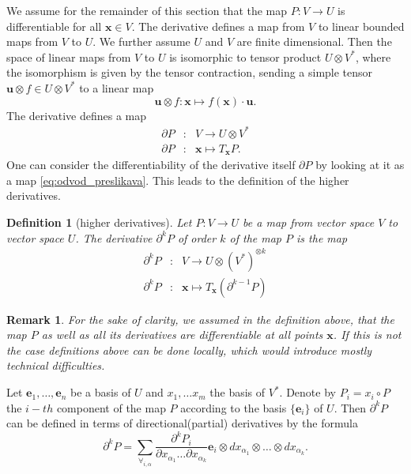 \documentclass[smallcondensed]{svjour3}
\newcommand{\e}{\mathbf{e}}
\newcommand{\x}{\mathbf{x}}
\newcommand{\uu}{\mathbf{u}}
\newcommand{\D}{\partial}
\newtheorem{definicija}{Definition}[section]
\newtheorem{opomba}{Remark}[section]
\begin{document}
We assume for the remainder of this section that the map $P:V\to U$ is
differentiable for all $\x\in V$. The derivative defines a map from $V$ to
linear bounded maps from $V$ to $U$. We further assume $U$ and $V$ are finite
dimensional. Then the space of linear maps from $V$ to $U$ is isomorphic to
tensor product $U\otimes V^*$, where the isomorphism is given by the
tensor contraction, sending a simple tensor $\uu\otimes f\in U\otimes
V^*$ to a linear map
 \begin{equation}
   \label{eq:lin_tenzor}
   \uu\otimes f:\x \mapsto f(\x)\cdot \uu.
 \end{equation}
The derivative defines a map
\begin{eqnarray}
  \label{eq:odvod_preslikava}
  \D P&:& V\to U\otimes V^*\\
  \D P&:& \x \mapsto T_\x P.
\end{eqnarray}
One can consider the differentiability of the derivative itself $\D P$ by
looking at it as a map \eqref{eq:odvod_preslikava}. This leads to the definition
of the higher derivatives.
\begin{definicija}[higher derivatives]
  \label{def:higher_derivatives}
  Let $P:V\to U$ be a map from vector space $V$ to vector space $U$. 
The derivative $\D^k P$ of order $k$ of the map $P$ is the map
\begin{eqnarray}\label{eq:partial}
    \label{eq:visji_odvod}
    \D^kP&:&V\to U\otimes (V^*)^{\otimes k}\\
    \D^kP&:&\x\mapsto T_\x\left( \D^{k-1}P \right)
  \end{eqnarray}
\end{definicija} 
\begin{opomba}
  For the sake of clarity, we assumed in the definition above, that the map $P$
  as well as all its derivatives are differentiable at all points $\x$. If this
  is not the case 
  definitions above can be done locally, which would introduce mostly technical
  difficulties. 
\end{opomba}
Let $\e_1,\ldots,\e_n$ be a basis of $U$ and $x_1,\ldots x_m$ the basis of
$V^*$. Denote by $P_i=x_i\circ P$ the $i-th$ component of the map
$P$ according to the basis $\{\e_i\}$ of $U$.
Then $\D^kP$  can be defined in terms of
directional(partial) derivatives by the formula
\begin{equation}\label{eq:d}
	\partial^kP=\sum_{\forall_{i,\alpha}}\frac{\partial^k P_i}{\partial
	    x_{\alpha_1}\ldots \partial x_{\alpha_k}}\e_i\otimes
	  dx_{\alpha_1}\otimes\ldots \otimes dx_{\alpha_k}.
\end{equation}
\end{document}
